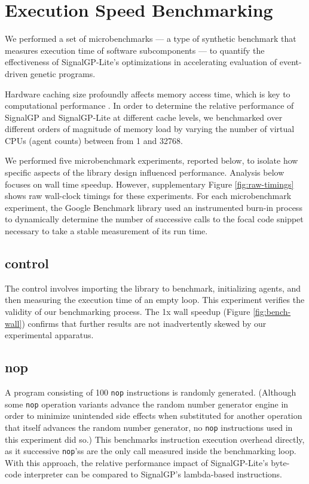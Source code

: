 \section{Execution Speed Benchmarking}



We performed a set of microbenchmarks --- a type of synthetic benchmark that measures execution time of software subcomponents --- to quantify the effectiveness of SignalGP-Lite's optimizations in accelerating evaluation of event-driven genetic programs.

Hardware caching size profoundly affects memory access time, which is key to computational performance \citep{skadron1999branch}.
In order to determine the relative performance of SignalGP and SignalGP-Lite at different cache levels, we benchmarked over different orders of magnitude of memory load by varying the number of virtual CPUs (agent counts) between from 1 and 32768.

We performed five microbenchmark experiments, reported below, to isolate how specific aspects of the library design influenced performance.
Analysis below focuses on wall time speedup.
However, supplementary Figure \ref{fig:raw-timings} shows raw wall-clock timings for these experiments.
For each microbenchmark experiment, the Google Benchmark library used an instrumented burn-in process to dynamically determine the number of successive calls to the focal code snippet necessary to take a stable measurement of its run time.

\subsection{control}

The control involves importing the library to benchmark, initializing agents, and then measuring the execution time of an empty loop. This experiment verifies the validity of our benchmarking process.
The 1x wall speedup (Figure \ref{fig:bench-wall}) confirms that further results are not inadvertently skewed by our experimental apparatus.

\subsection{nop}

A program consisting of 100 \texttt{nop} instructions is randomly generated.
(Although some \texttt{nop} operation variants advance the random number generator engine in order to minimize unintended side effects when substituted for another operation that itself advances the random number generator, no \texttt{nop} instructions used in this experiment did so.)
This benchmarks instruction execution overhead directly, as it successive \texttt{nop}'ss are the only call measured inside the benchmarking loop.
With this approach, the relative performance impact of SignalGP-Lite's byte-code interpreter can be compared to SignalGP's lambda-based instructions.

